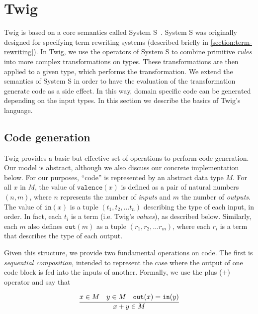 
\section{Twig}


Twig is based on a core semantics called System S~\cite{Visser:1998p333}.
System S was originally designed for specifying term rewriting systems
(described briefly in \ref{section:term-rewriting}). In Twig, we use the
operators of System S to combine primitive \emph{rules} into more complex
transformations on types. These transformations are then applied to a given
type, which performs the transformation. We extend the semantics of System S
in order to have the evaluation of the transformation generate code as a side
effect. In this way, domain specific code can be generated depending on the
input types. In this section we describe the basics of Twig's language.

\subsection{Code generation}
\label{twig:code-gen}

Twig provides a basic but effective set of operations to perform code
generation. Our model is abstract, although we also discuss our concrete
implementation below. For our purposes, ``code'' is represented by an abstract
data type $M$. For all $x$ in $M$, the value of $\mathtt{valence}(x)$ is
defined as a pair of natural numbers $(n,m)$, where $n$ represents the number
of \emph{inputs} and $m$ the number of \emph{outputs}. The value of
$\mathtt{in}(x)$ is a tuple $(t_1,t_2, \hdots t_n)$ describing the type of
each input, in order. In fact, each $t_i$ is a term (i.e. Twig's
\emph{values}), as described below. Similarly, each $m$ also defines
$\mathtt{out}(m)$ as a tuple $(r_1,r_2, \hdots r_m)$, where each $r_i$ is a
term that describes the type of each output.

Given this structure, we provide two fundamental operations on code. The first
is \emph{sequential composition}, intended to represent the case where the
output of one code block is fed into the inputs of another. Formally,
we use the plus ($+$) operator and say that

\[
\infer
{x+y \in M}
{x \in M \quad y \in M \quad \mathtt{out}(x) = \mathtt{in}(y)}
\]

